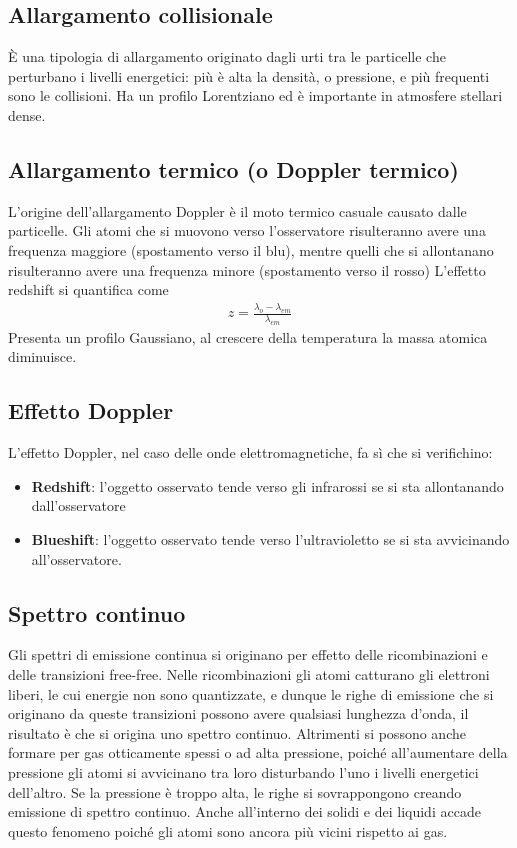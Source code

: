 \documentclass[a4paper, oneside]{book}
\begin{document}
\subsection{Allargamento collisionale}
È una tipologia di allargamento originato dagli urti tra le particelle 
che perturbano i livelli energetici: più è alta la densità, o pressione, e 
più frequenti sono le collisioni. Ha un profilo Lorentziano ed è 
importante in atmosfere stellari dense. 

\subsection{Allargamento termico (o Doppler termico)}
L'origine dell'allargamento Doppler è il moto termico casuale causato dalle particelle. Gli atomi che
si muovono verso l'osservatore risulteranno avere una frequenza maggiore (spostamento verso il blu), 
mentre quelli che si allontanano risulteranno avere una frequenza minore (spostamento verso il rosso)
L'effetto redshift si quantifica come
\begin{gather*}
    z = \frac{\lambda_{o} - \lambda_{em}}{\lambda_{em}}
\end{gather*}
Presenta un profilo Gaussiano, al crescere della temperatura la massa atomica diminuisce. 

\subsection{Effetto Doppler}
L'effetto Doppler, nel caso delle onde elettromagnetiche, fa sì che si verifichino:
\begin{itemize}
    \item \textbf{Redshift}: l'oggetto osservato tende verso gli infrarossi se 
    si sta allontanando dall'osservatore
    \item \textbf{Blueshift}: l'oggetto osservato tende verso l'ultravioletto 
    se si sta avvicinando all'osservatore.
\end{itemize}

\subsection{Spettro continuo}
Gli spettri di emissione continua si originano per effetto delle ricombinazioni 
e delle transizioni free-free. Nelle ricombinazioni gli atomi catturano gli elettroni liberi, 
le cui energie non sono quantizzate, e dunque le righe di emissione che si originano 
da queste transizioni possono avere qualsiasi lunghezza d'onda, il risultato è che si 
origina uno spettro continuo. Altrimenti si possono anche formare per gas otticamente spessi
o ad alta pressione, poiché all'aumentare della pressione gli atomi si avvicinano 
tra loro disturbando l'uno i livelli energetici dell'altro. Se la pressione è troppo alta,
le righe si sovrappongono creando emissione di spettro continuo. Anche all'interno 
dei solidi e dei liquidi accade questo fenomeno poiché gli atomi sono ancora più vicini rispetto
ai gas. 
\end{document}
